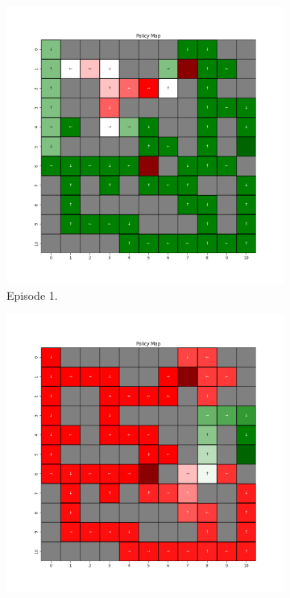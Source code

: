 \documentclass{assignment}
\begin{document}
\begin{figure}[H]
    \begin{subfigure}{0.3\textwidth}
        \includegraphics[width=\textwidth]{figures/policy_q/alpha_sweep/policy_alpha_0.5_gamma_0.95_epsilon_0.2_iteration_1.png}
    \caption{Episode 1.}
    \end{subfigure}\hfill
    \begin{subfigure}{0.3\textwidth}
        \includegraphics[width=\textwidth]{figures/policy_q/alpha_sweep/policy_alpha_0.5_gamma_0.95_epsilon_0.2_iteration_50.png}

\end{subfigure}
\end{figure}
\end{document}
